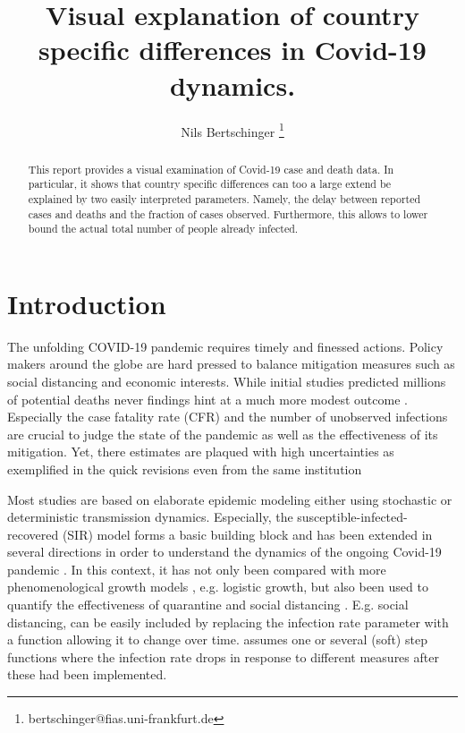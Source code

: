 \documentclass[fullpage,a4paper]{article}
\title{Visual explanation of country specific differences in
  Covid-19 dynamics.}
\author[1,2]{Nils Bertschinger \thanks{bertschinger@fias.uni-frankfurt.de}}
\affil[1]{Department of Systemic Risk, Frankfurt Institute for Advanced Studies, Frankfurt am Main, Germany}
\affil[2]{Department of Computer Science, Goethe University, Frankfurt am Main, Germany}
\begin{document}
\maketitle%

\begin{abstract}
  This report provides a visual examination of Covid-19 case and death
  data. In particular, it shows that country specific differences can
  too a large extend be explained by two easily interpreted
  parameters. Namely, the delay between reported cases and deaths and
  the fraction of cases observed. Furthermore, this allows to lower
  bound the actual total number of people already infected.
\end{abstract}

\section{Introduction}

The unfolding COVID-19 pandemic requires timely and finessed
actions. Policy makers around the globe are hard pressed to balance
mitigation measures such as social distancing and economic
interests. While initial studies \cite{imperial1} predicted millions
of potential deaths never findings hint at a much more modest outcome
\cite{Lourenco2020.03.24.20042291,imperial2}. Especially the case
fatality rate (CFR) and the number of unobserved infections are
crucial to judge the state of the pandemic as well as the
effectiveness of its mitigation. Yet, there estimates are plaqued with
high uncertainties as exemplified in the quick revisions even from the
same institution \cite{imperial1,imperial2}

Most studies are based on elaborate epidemic modeling either using
stochastic or deterministic transmission dynamics. Especially, the
susceptible-infected-recovered (SIR) model \cite{Newman} forms a
basic building block and has been extended in several directions in
order to understand the dynamics of the ongoing Covid-19 pandemic
\cite{arxiv:2002.07572,arxiv:2004.01105,10.1126/science.abb3221,https://www.medrxiv.org/content/10.1101/2020.02.27.20028639v2}.
In this context, it has not only been compared with more
phenomenological growth models
\cite{https://doi.org/10.1101/2020.03.12.20034595}, e.g. logistic
growth, but also been used to quantify the effectiveness of quarantine
and social distancing \cite{arxiv:2002.07572,arxiv:2004.01105}.
E.g. social distancing, can be easily included by replacing the
infection rate parameter with a function allowing it to change over
time. \cite{arxiv:2004.01105} assumes one or several (soft) step
functions where the infection rate drops in response to different
measures after these had been implemented.
\end{document}
